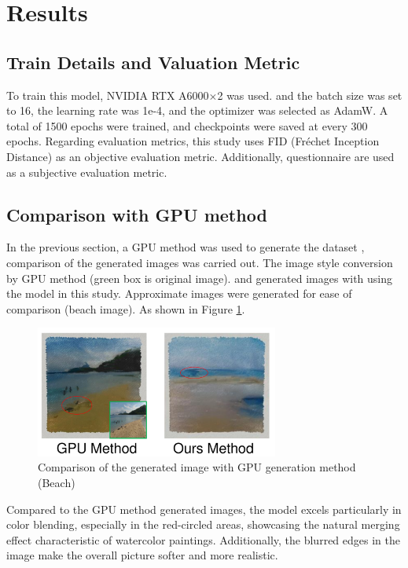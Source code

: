 \documentclass{acsman}
\begin{document}
\section{Results}\label{sec:result}
\subsection{Train Details and Valuation Metric}
To train this model, NVIDIA RTX A6000$\times$2 was used. and the batch size was set to 16, the learning rate was 1e-4, and the optimizer was selected as AdamW. A total of 1500 epochs were trained, and checkpoints were saved at every 300 epochs. 
Regarding evaluation metrics, this study uses FID (Fréchet Inception Distance) \cite{FID} as an objective evaluation metric. Additionally, questionnaire are used as a subjective evaluation metric. 
\subsection{Comparison with GPU method}
In the previous section, a GPU method was used to generate the dataset \cite{huang2021gpu},
comparison of the generated images was carried out. The image style conversion by GPU method (green box is original image). and generated images with using the model in this study. Approximate images were generated for ease of comparison (beach image). As shown in Figure \ref{fig:wGPU}.

\begin{figure}[htbp]
    \centering
    \includegraphics[width=8cm]{image/wGPU.pdf}
    \caption{Comparison of the generated image with GPU generation method (Beach)}
    \label{fig:wGPU}
\end{figure}

Compared to the GPU method generated images, the model excels particularly in color blending, especially in the red-circled areas, showcasing the natural merging effect characteristic of watercolor paintings. Additionally, the blurred edges in the image make the overall picture softer and more realistic.
\end{document}
